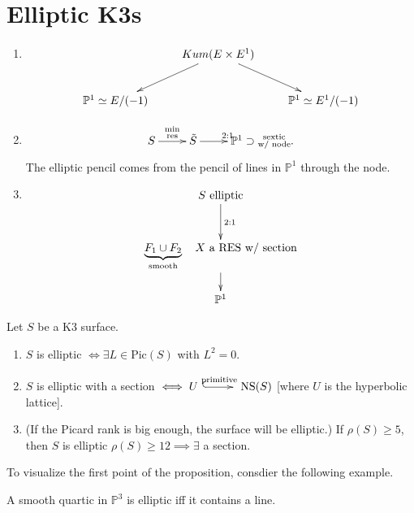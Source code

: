 \section{Elliptic K3s}
\label{section-elliptic-k3}

\begin{enumerate}
\item
$$
\xymatrix{
&Kum(E \times E^1)\ar[dl]\ar[dr]\\
\mathbb{P}^1\simeq E/(-1)& & \mathbb{P}^1
\simeq E^1/(-1)
}
$$

\item
$$
\xymatrix{
S \ar[r]^{\substack{\text{min} \\
\text{res}}}
&\tilde{S} \ar[r]^{2:1}
&\mathbb{P}^1 \supset \substack{\text{sextic}
\\ \text{w/ node}}.
}
$$
The elliptic pencil comes from the pencil of
lines in $\mathbb{P}^1$
through the node.

\item
$$
\xymatrix{
S \text{ elliptic}\ar[d]^{2:1}\\
\underbrace{F_1 \cup
F_2}_{\text{smooth}}\quad
X \text{ a RES w/ section}\ar[d]\\
\mathbb{P}^1
}
$$
\end{enumerate}

\begin{proposition}
\label{proposition-elliptic-k3}
Let $S$ be a K3 surface.
\begin{enumerate}
\item $S$ is elliptic $\iff \exists  L \in
\text{Pic}(S)$ with $L^2=0$.

\item $S$ is elliptic with a section $\iff U
\xymatrix{\ar@{^{(}->}[r]^{
\text{primitive}}&} \text{NS}(S)$ [where $U$
is the hyperbolic lattice].

\item (If the Picard rank is big enough, the
surface will be elliptic.)
If $\rho(S) \geq 5$, then $S$ is elliptic
$\rho(S) \geq  12 \implies \exists $ a
section.
\end{enumerate}
\end{proposition}

To visualize the first point of the
proposition,
consdier the following example.

\begin{example}
\label{example-smooth-quartic-elliptic}
A smooth quartic in $\mathbb{P}^3$ is
elliptic iff it contains a line.
\end{example}

